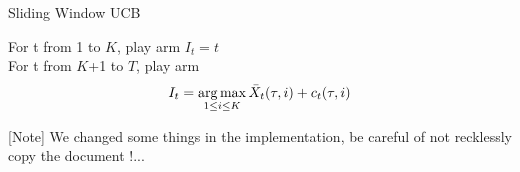 \begin{algorithm}
    \caption{Sliding Window UCB}
    \label{alg:sw_ucb}
    For t from 1 to $K$, play arm $I_t = t$ \\
    For t from $K$+1 to $T$, play arm 
    $$ I_t = \operatorname*{arg\,max}_{1\leq i \leq K} \bar X_t(\tau,i) + c_t(\tau,i)$$
\end{algorithm}

[Note] We changed some things in the implementation, be careful of not recklessly copy the document !...